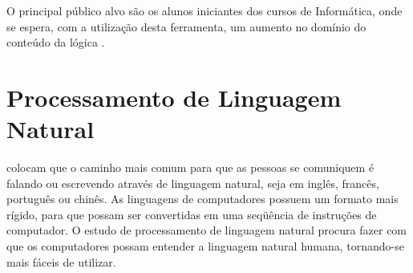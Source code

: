 O principal público alvo são os alunos iniciantes dos cursos de Informática,
onde se espera, com a utilização desta ferramenta, um aumento no domínio do
conteúdo da lógica \cite{118}.

\section{Processamento de Linguagem Natural}

 colocam que o caminho mais comum para que as
pessoas se comuniquem é falando ou escrevendo através de linguagem natural, seja
em inglês, francês, português ou chinês. As linguagens de computadores possuem
um formato mais rígido, para que possam ser convertidas em uma seqüência de
instruções de computador. O estudo de processamento de linguagem natural procura
fazer com que os computadores possam entender a linguagem natural humana,
tornando-se mais fáceis de utilizar.
